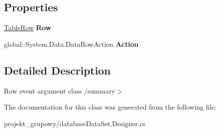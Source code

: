 \subsection*{Properties}
\begin{DoxyCompactItemize}
\item 
\mbox{\label{classprojekt__grupowy_1_1database_data_set_1_1_table_row_change_event_a6dce7b7206150eeea08aa491b409de26}} 
\hyperlink{classprojekt__grupowy_1_1database_data_set_1_1_table_row}{Table\+Row} {\bfseries Row}
\item 
\mbox{\label{classprojekt__grupowy_1_1database_data_set_1_1_table_row_change_event_a0a349af0d99f4e443f4136e4d91e8d18}} 
global\+::\+System.\+Data.\+Data\+Row\+Action {\bfseries Action}
\end{DoxyCompactItemize}


\subsection{Detailed Description}
Row event argument class /summary$>$ 

The documentation for this class was generated from the following file\+:\begin{DoxyCompactItemize}
\item 
projekt\+\_\+grupowy/database\+Data\+Set.\+Designer.\+cs\end{DoxyCompactItemize}
